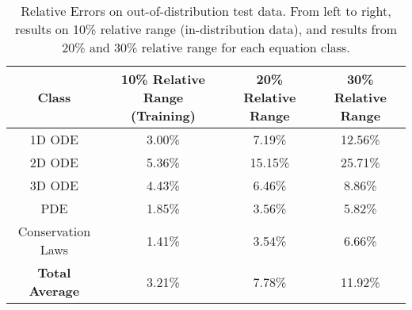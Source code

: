 \documentclass{article}
\begin{document}
\begin{table}[H]
\centering
\begin{tabular}{|c|c|c|c|}
\hline
\textbf{Class} & \textbf{10\% Relative Range (Training)} & \textbf{20\% Relative Range} & \textbf{30\% Relative Range} \\
\hline
1D ODE & 3.00\% & 7.19\% & 12.56\% \\
2D ODE & 5.36\% & 15.15\% & 25.71\% \\
3D ODE & 4.43\% & 6.46\% & 8.86\% \\
PDE & 1.85\% & 3.56\% & 5.82\% \\
Conservation Laws & 1.41\% & 3.54\% & 6.66\% \\
\hline
\textbf{Total Average} & 3.21\% & 7.78\% & 11.92\% \\
\hline
\end{tabular}
\caption{Relative Errors on out-of-distribution test data. From left to right, results on 10\% relative range (in-distribution data), and results from 20\% and 30\% relative range for each equation class.}
\label{OOD_test}
\end{table}
\end{document}
